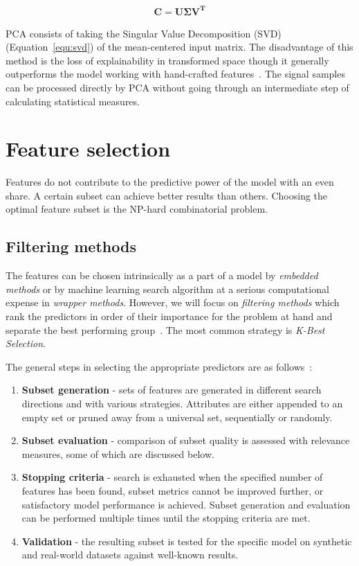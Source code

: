 \begin{ceqn}\begin{align}
\mathbf{C} = \mathbf{U \Sigma V^T}
\label{equ:svd}
\end{align}\end{ceqn}

PCA consists of taking the Singular Value Decomposition (SVD) (Equation~\ref{equ:svd}) of the mean-centered input matrix. The disadvantage of this method is the loss of explainability in transformed space though it generally outperforms the model working with hand-crafted features~\cite{brito_fault_2021}. The signal samples can be processed directly by PCA without going through an intermediate step of calculating statistical measures.

\section{Feature selection}
Features do not contribute to the predictive power of the model with an even share. A certain subset can achieve better results than others. Choosing the optimal feature subset is the NP-hard combinatorial problem.

\subsection{Filtering methods}
The features can be chosen intrinsically as a part of a model by \emph{embedded methods} or by machine learning search algorithm at a serious computational expense in \emph{wrapper methods}. However, we will focus on \emph{filtering methods} which rank the predictors in order of their importance for the problem at hand and separate the best performing group~\cite{johnson_feature_2019}. The most common strategy is \emph{K-Best Selection}.

The general steps in selecting the appropriate predictors are as follows~\cite{nandi_condition_2019}:

\begin{enumerate}
    \itemsep0pt
    \item \textbf{Subset generation} - sets of features are generated in different search directions and with various strategies. Attributes are either appended to an empty set or pruned away from a universal set, sequentially or randomly.

    \item \textbf{Subset evaluation} - comparison of subset quality is assessed with relevance measures, some of which are discussed below.

    \item \textbf{Stopping criteria} - search is exhausted when the specified number of features has been found, subset metrics cannot be improved further, or satisfactory model performance is achieved. Subset generation and evaluation can be performed multiple times until the stopping criteria are met.

    \item \textbf{Validation} - the resulting subset is tested for the specific model on synthetic and real-world datasets against well-known results.
\end{enumerate}

